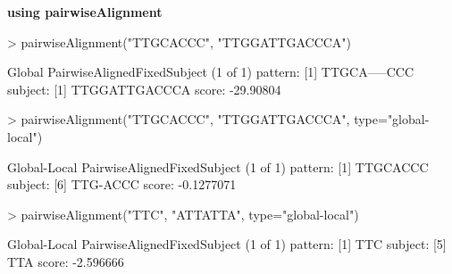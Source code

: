 \documentclass[pdf]{beamer}
\begin{document}
\begin{frame}[fragile]
\textbf{using pairwiseAlignment}
\begin{block}{}
\begin{footnotesize}
\begin{Schunk}
\begin{Sinput}
> pairwiseAlignment("TTGCACCC", "TTGGATTGACCCA")
\end{Sinput}
\begin{Soutput}
Global PairwiseAlignedFixedSubject (1 of 1)
pattern: [1] TTGCA-----CCC 
subject: [1] TTGGATTGACCCA 
score: -29.90804 
\end{Soutput}
\begin{Sinput}
> pairwiseAlignment("TTGCACCC", "TTGGATTGACCCA", type="global-local")
\end{Sinput}
\begin{Soutput}
Global-Local PairwiseAlignedFixedSubject (1 of 1)
pattern: [1] TTGCACCC 
subject: [6] TTG-ACCC 
score: -0.1277071 
\end{Soutput}
\begin{Sinput}
> pairwiseAlignment("TTC", "ATTATTA", type="global-local")
\end{Sinput}
\begin{Soutput}
Global-Local PairwiseAlignedFixedSubject (1 of 1)
pattern: [1] TTC 
subject: [5] TTA 
score: -2.596666 
\end{Soutput}
\end{Schunk}
\end{footnotesize}
\end{block}
\end{frame}
\end{document}
